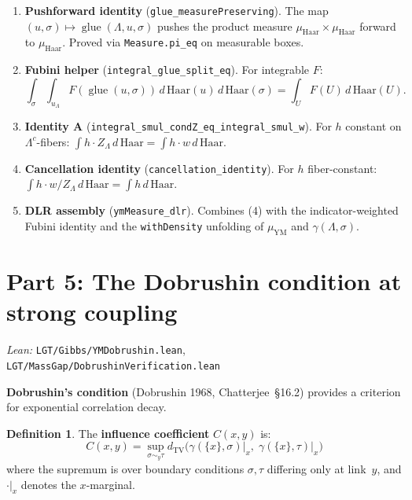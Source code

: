 \documentclass[11pt,a4paper]{article}
\theoremstyle{definition}
\newtheorem{definition}[theorem]{Definition}
\newcommand{\TV}{\operatorname{TV}}
\newcommand{\glue}{\operatorname{glue}}
\begin{document}
\begin{enumerate}
\item \textbf{Pushforward identity}
  (\texttt{glue\_measurePreserving}). The map
  $(u, \sigma) \mapsto \glue(\Lambda, u, \sigma)$ pushes the
  product measure
  $\mu_{\mathrm{Haar}} \times \mu_{\mathrm{Haar}}$ forward to $\mu_{\mathrm{Haar}}$. Proved via
  \texttt{Measure.pi\_eq} on measurable boxes.

\item \textbf{Fubini helper}
  (\texttt{integral\_glue\_split\_eq}). For integrable $F$:
  \[
    \int_\sigma \!\int_{u_\Lambda}\!
    F(\glue(u, \sigma))\, d\,\mathrm{Haar}(u)\, d\,\mathrm{Haar}(\sigma)
    = \int_U F(U)\, d\,\mathrm{Haar}(U).
  \]

\item \textbf{Identity A}
  (\texttt{integral\_smul\_condZ\_eq\_integral\_smul\_w}).
  For $h$ constant on $\Lambda^c$-fibers:
  $\int h \cdot Z_\Lambda\, d\,\mathrm{Haar} = \int h \cdot w\, d\,\mathrm{Haar}$.

\item \textbf{Cancellation identity}
  (\texttt{cancellation\_identity}). For $h$ fiber-constant:
  $\int h \cdot w/Z_\Lambda\, d\,\mathrm{Haar} = \int h\, d\,\mathrm{Haar}$.

\item \textbf{DLR assembly} (\texttt{ymMeasure\_dlr}).
  Combines (4) with the indicator-weighted Fubini identity and the
  \texttt{withDensity} unfolding of $\mu_{\mathrm{YM}}$ and
  $\gamma(\Lambda, \sigma)$.
\end{enumerate}

\section{Part 5: The Dobrushin condition at strong coupling}

\textit{Lean:} \texttt{LGT/Gibbs/YMDobrushin.lean},
\texttt{LGT/MassGap/DobrushinVerification.lean}

\medskip

\textbf{Dobrushin's condition} (Dobrushin 1968,
Chatterjee~\S16.2) provides a criterion for exponential
correlation decay.

\begin{definition}
The \textbf{influence coefficient} $C(x, y)$ is:
\[
  C(x, y) = \sup_{\sigma \sim_y \tau}
  d_{\TV}\!\bigl(
    \gamma(\{x\}, \sigma)\big|_x,\;
    \gamma(\{x\}, \tau)\big|_x
  \bigr)
\]
where the supremum is over boundary conditions $\sigma, \tau$
differing only at link~$y$, and $\cdot|_x$ denotes the
$x$-marginal.
\end{definition}
\end{document}
